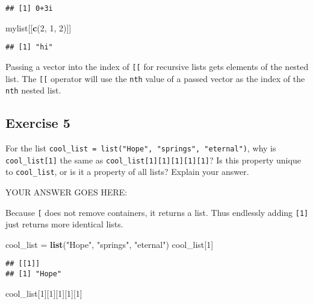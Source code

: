 \documentclass[
]{article}
\newenvironment{Shaded}{\begin{snugshade}}{\end{snugshade}}
\newcommand{\DecValTok}[1]{\textcolor[rgb]{0.00,0.00,0.81}{#1}}
\newcommand{\KeywordTok}[1]{\textcolor[rgb]{0.13,0.29,0.53}{\textbf{#1}}}
\newcommand{\NormalTok}[1]{#1}
\newcommand{\StringTok}[1]{\textcolor[rgb]{0.31,0.60,0.02}{#1}}
\begin{document}
\begin{verbatim}
## [1] 0+3i
\end{verbatim}

\begin{Shaded}
\begin{Highlighting}[]
\NormalTok{mylist[[}\KeywordTok{c}\NormalTok{(}\DecValTok{2}\NormalTok{, }\DecValTok{1}\NormalTok{, }\DecValTok{2}\NormalTok{)]]}
\end{Highlighting}
\end{Shaded}

\begin{verbatim}
## [1] "hi"
\end{verbatim}

Passing a vector into the index of \texttt{{[}{[}} for recursive lists
gets elements of the nested list. The \texttt{{[}{[}} operator will use
the \texttt{nth} value of a passed vector as the index of the
\texttt{nth} nested list.

\hypertarget{exercise-5}{%
\subsection{Exercise 5}\label{exercise-5}}

For the list
\texttt{cool\_list\ =\ list("Hope",\ "springs",\ "eternal")}, why is
\texttt{cool\_list{[}1{]}} the same as
\texttt{cool\_list{[}1{]}{[}1{]}{[}1{]}{[}1{]}{[}1{]}}? Is this property
unique to \texttt{cool\_list}, or is it a property of all lists? Explain
your answer.

YOUR ANSWER GOES HERE:

Because \texttt{{[}} does not remove containers, it returns a list. Thus
endlessly adding \texttt{{[}1{]}} just returns more identical lists.

\begin{Shaded}
\begin{Highlighting}[]
\NormalTok{cool\_list =}\StringTok{ }\KeywordTok{list}\NormalTok{(}\StringTok{"Hope"}\NormalTok{, }\StringTok{"springs"}\NormalTok{, }\StringTok{"eternal"}\NormalTok{)}
\NormalTok{cool\_list[}\DecValTok{1}\NormalTok{]}
\end{Highlighting}
\end{Shaded}

\begin{verbatim}
## [[1]]
## [1] "Hope"
\end{verbatim}

\begin{Shaded}
\begin{Highlighting}[]
\NormalTok{cool\_list[}\DecValTok{1}\NormalTok{][}\DecValTok{1}\NormalTok{][}\DecValTok{1}\NormalTok{][}\DecValTok{1}\NormalTok{][}\DecValTok{1}\NormalTok{]}
\end{Highlighting}
\end{Shaded}
\end{document}
